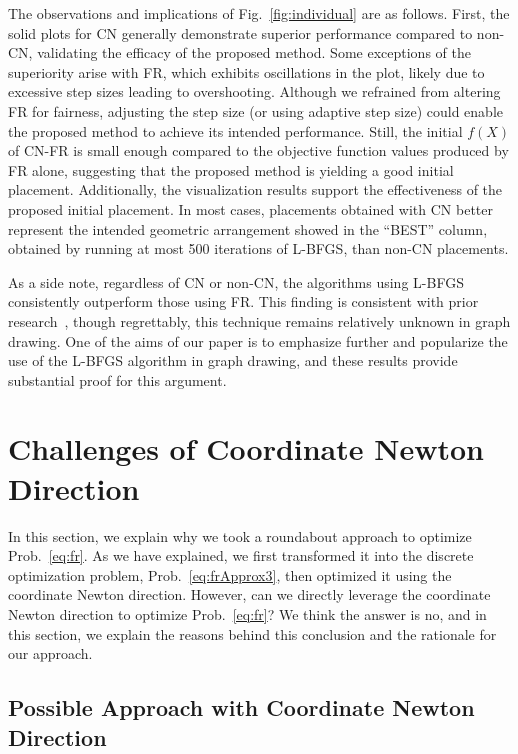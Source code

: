 \documentclass[dvipdfmx,10pt,journal,compsoc]{IEEEtran}
\begin{document}
The observations and implications of Fig.~\ref{fig:individual} are as follows.
First, the solid plots for \textsf{CN} generally demonstrate superior performance compared to non-\textsf{CN}, validating the efficacy of the proposed method.
Some exceptions of the superiority arise with \textsf{FR}, which exhibits oscillations in the plot, likely due to excessive step sizes leading to overshooting.
Although we refrained from altering \textsf{FR} for fairness, adjusting the step size (or using adaptive step size) could enable the proposed method to achieve its intended performance.
Still, the initial $f(X)$ of \textsf{CN-FR} is small enough compared to the objective function values produced by \textsf{FR} alone, suggesting that the proposed method is yielding a good initial placement.
Additionally, the visualization results support the effectiveness of the proposed initial placement. In most cases, placements obtained with \textsf{CN} better represent the intended geometric arrangement showed in the ``BEST'' column, obtained by running at most 500 iterations of L-BFGS, than non-\textsf{CN} placements.

As a side note, regardless of \textsf{CN} or non-\textsf{CN}, the algorithms using \textsf{L-BFGS} consistently outperform those using \textsf{FR}.
This finding is consistent with prior research~\cite{6183577}, though regrettably, this technique remains relatively unknown in graph drawing.
One of the aims of our paper is to emphasize further and popularize the use of the L-BFGS algorithm in graph drawing, and these results provide substantial proof for this argument.

\section{Challenges of Coordinate Newton Direction}\label{sec:challenges}

In this section, we explain why we took a roundabout approach to optimize Prob.~\eqref{eq:fr}.
As we have explained, we first transformed it into the discrete optimization problem, Prob.~\eqref{eq:frApprox3}, then optimized it using the coordinate Newton direction. However, can we directly leverage the coordinate Newton direction to optimize Prob.~\eqref{eq:fr}?
We think the answer is no, and in this section, we explain the reasons behind this conclusion and the rationale for our approach.

\subsection{Possible Approach with Coordinate Newton Direction}\label{ssec:possibleApproach}
\end{document}

